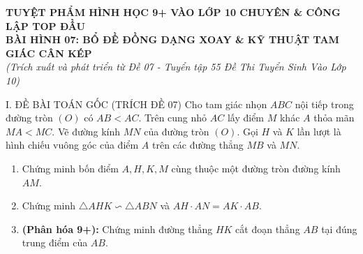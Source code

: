 \documentclass[11pt,a4paper]{article}
\begin{document}
\begin{center}
    {\Large\bfseries\color{blue!80!black} TUYỆT PHẨM HÌNH HỌC 9+ VÀO LỚP 10 CHUYÊN \& CÔNG LẬP TOP ĐẦU}\\[2mm]
    {\large\bfseries BÀI HÌNH 07: BỔ ĐỀ ĐỒNG DẠNG XOAY \& KỸ THUẬT TAM GIÁC CÂN KÉP}\\[1mm]
    \textit{(Trích xuất và phát triển từ Đề 07 - Tuyển tập 55 Đề Thi Tuyển Sinh Vào Lớp 10)}
\end{center}

\vspace{1mm}

\begin{modelbox}{I. ĐỀ BÀI TOÁN GỐC (TRÍCH ĐỀ 07)}
Cho tam giác nhọn $ABC$ nội tiếp trong đường tròn $(O)$ có $AB < AC$. Trên cung nhỏ $AC$ lấy điểm $M$ khác $A$ thỏa mãn $MA < MC$. Vẽ đường kính $MN$ của đường tròn $(O)$. Gọi $H$ và $K$ lần lượt là hình chiếu vuông góc của điểm $A$ trên các đường thẳng $MB$ và $MN$.
\begin{enumerate}[label=\textbf{\alph*)}]
    \item Chứng minh bốn điểm $A, H, K, M$ cùng thuộc một đường tròn đường kính $AM$.
    \item Chứng minh $\triangle AHK \backsim \triangle ABN$ và $AH \cdot AN = AK \cdot AB$.
    \item \textbf{(Phân hóa 9+):} Chứng minh đường thẳng $HK$ cắt đoạn thẳng $AB$ tại đúng trung điểm của $AB$.
\end{enumerate}
\end{modelbox}

\vspace{1mm}
\end{document}
